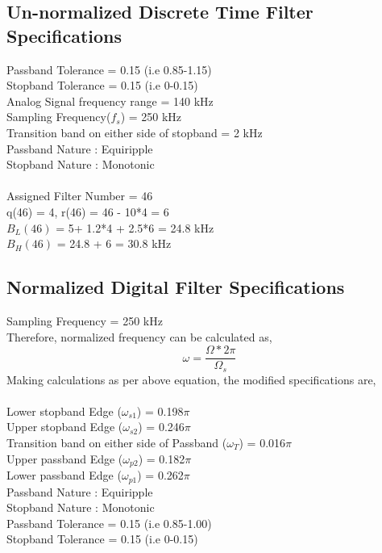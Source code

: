 \documentclass[12pt]{article}
\begin{document}
\subsection{Un-normalized Discrete Time Filter Specifications}
Passband Tolerance = 0.15 (i.e 0.85-1.15)\\
Stopband Tolerance = 0.15 (i.e 0-0.15)\\
Analog Signal frequency range = 140 kHz\\
Sampling Frequency($f_s$) = 250 kHz\\
Transition band on either side of stopband = 2 kHz\\ 
Passband Nature : Equiripple\\
Stopband Nature : Monotonic\\\\
Assigned Filter Number = 46\\
q(46) = 4, r(46) = 46 - 10*4 = 6\\
$B_L(46)$ = 5+ 1.2*4 + 2.5*6 = 24.8 kHz\\
$B_H(46)$ = 24.8 + 6 = 30.8 kHz

\subsection{Normalized Digital Filter Specifications}
Sampling Frequency = 250 kHz\\
Therefore, normalized frequency can be calculated as,
\begin{equation}
    \omega = \frac{\Omega*2\pi}{\Omega_s}
\end{equation} 
Making calculations as per above equation, the modified specifications are,
\\\\
Lower stopband Edge ($\omega_{s1}$) = 0.198$\pi$\\
Upper stopband Edge ($\omega_{s2}$) = 0.246$\pi$\\
Transition band on either side of Passband ($\omega_T$) = 0.016$\pi$ \\
Upper passband Edge ($\omega_{p2}$) = 0.182$\pi$\\
Lower passband Edge ($\omega_{p1}$) = 0.262$\pi$\\
Passband Nature : Equiripple\\
Stopband Nature : Monotonic\\
Passband Tolerance = 0.15 (i.e 0.85-1.00)\\
Stopband Tolerance = 0.15 (i.e 0-0.15)
\end{document}
